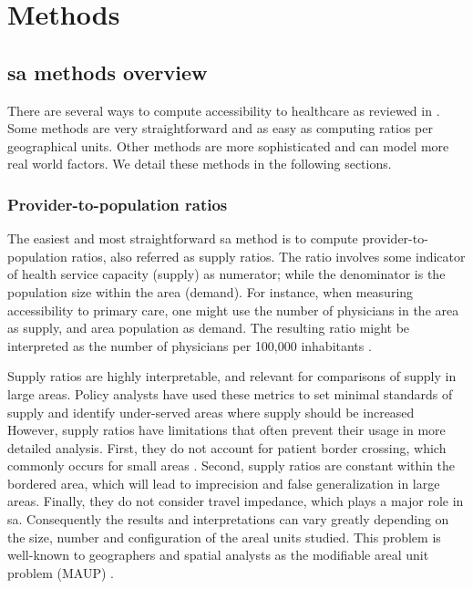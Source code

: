 \section{Methods}

\subsection{\acf{sa} methods overview}

There are several ways to compute accessibility to healthcare as reviewed in
\cite{guagliardo_spatial_2004}. Some methods are very straightforward and as
easy as computing ratios per geographical units. Other methods are more
sophisticated and can model more real world factors. We detail these methods in
the following sections.

\subsubsection{Provider-to-population ratios}

The easiest and most straightforward \ac{sa} method is to compute
provider-to-population ratios, also referred as supply ratios. The ratio
involves some indicator of health service capacity (supply) as numerator; while
the denominator is the population size within the area (demand). For instance,
when measuring accessibility to primary care, one might use the number of
physicians in the area as supply, and area population as demand. The resulting
ratio might be interpreted as the number of physicians per 100,000 inhabitants
\cite{schonfeld_numbers_1972}.

Supply ratios are highly interpretable, and relevant for comparisons of supply
in large areas. Policy analysts have used these metrics to set minimal standards
of supply and identify under-served areas where supply should be increased
\cite{schonfeld_numbers_1972,council_on_graduate_medical_education_physician_1998,connor_competition_1995}%
However, supply ratios have limitations that often prevent their usage in more
detailed analysis. First, they do not account for patient border crossing, which
commonly occurs for small areas
\cite{connor_measuring_1994,basu_border-crossing_1996,basu_medicare_1995,holahan_border_1993}.
Second, supply ratios are constant within the bordered area, which will lead to
imprecision and false generalization in large areas. Finally, they do not
consider travel impedance, which plays a major role in \ac{sa}. Consequently the
results and interpretations can vary greatly depending on the size, number and
configuration of the areal units studied. This problem is well-known to
geographers and spatial analysts as the modifiable areal unit problem (MAUP)
\cite{openshaw_modifiable_1983}.

